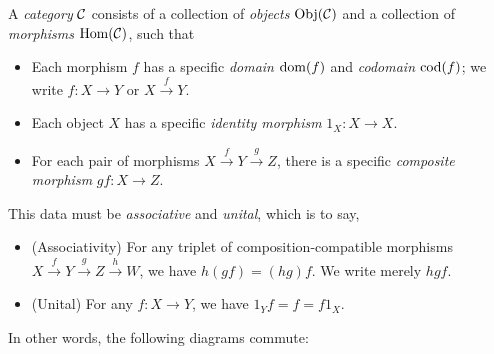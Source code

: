 

\begin{dfn*}[Category]
	A \emph{category} $\mathcal{C}$ consists of a collection of \emph{objects} $\operatorname{Obj}(\mathcal{C})$
	and a collection of \emph{morphisms} $\operatorname{Hom}(\mathcal{C})$, such that

	\begin{itemize}
		\item Each morphism $f$ has a specific \emph{domain} $\operatorname{dom}(f)$ and
		      \emph{codomain} $\operatorname{cod}(f)$; we write $f: X\rightarrow Y$ or
		      $X\xrightarrow{f} Y$.
		\item Each object $X$ has a specific \emph{identity morphism} $1_X:
			      X\rightarrow X$.
		\item For each pair of morphisms $X\xrightarrow{f} Y\xrightarrow{g}
			      Z$, there is a specific \emph{composite morphism} $gf:
			      X\rightarrow Z$.
	\end{itemize}
	This data must be \emph{associative} and \emph{unital}, which is to say,
	\begin{itemize}
		\item (Associativity) For any triplet of composition-compatible morphisms
		      $X\xrightarrow{f}Y \xrightarrow{g}Z\xrightarrow{h}W$, we have $h(gf) =
			      (hg)f$. We write merely $hgf$.
		\item (Unital) For any $f: X\rightarrow Y$, we have $1_Yf = f = f1_X$.
	\end{itemize}

	In other words, the following diagrams commute:

	\begin{figure}[H]
		\centering
		\begin{multicols}{2}

		\end{multicols}
	\end{figure}
\end{dfn*}


